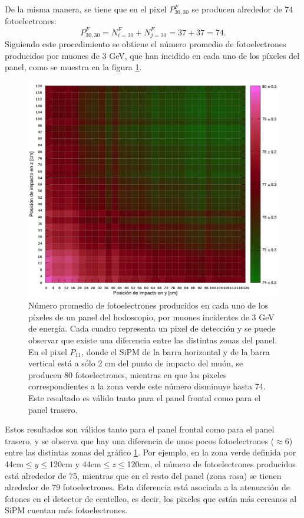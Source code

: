 \documentclass[12pt,oneside,openany,letter]{book}
\begin{document}
De la misma manera, se tiene que en el pixel $P^{F}_{30,30}$ se producen alrededor de 74 fotoelectrones:
\begin{equation}
P^{F}_{30,30}= N^{F}_{i=30}+N^{F}_{j=30}= 37+37 = 74.
\end{equation}
Siguiendo este procedimiento se obtiene el número promedio de fotoelectrones producidos por muones de 3 GeV, que han incidido en cada uno de los píxeles del panel, como se muestra en la figura \ref{atenuacion_panel_round}. 
\begin{figure}[h!]
    \centering
        \includegraphics[scale=0.6]{atenuacion_panel_nuevo_2.png}
   \caption[Respuesta de los paneles del hodoscopio]{N\'umero promedio de fotoelectrones producidos en cada uno de los p\'ixeles de un panel del hodoscopio, por muones incidentes de 3 GeV de energ\'ia. Cada cuadro representa un pixel de detecci\'on y se puede observar que existe una diferencia entre las distintas zonas del panel. En el pixel $P_{11}$, donde el SiPM de la barra horizontal y de la barra vertical está a sólo 2 cm del punto de impacto del muón, se producen 80 fotoelectrones, mientras en que los pixeles correspondientes a la zona verde este n\'umero disminuye hasta 74. Este resultado es v\'alido tanto para el panel frontal como para el panel trasero.}\label{atenuacion_panel_round}
\end{figure}

Estos resultados son v\'alidos tanto para el panel frontal como para el panel trasero, y se observa que hay una diferencia de unos pocos fotoelectrones ($\approx 6$) entre las distintas zonas del gr\'afico \ref{atenuacion_panel_round}. Por ejemplo, en la zona verde definida por 44cm$\leq y \leq$120cm y 44cm$\leq z \leq$120cm, el n\'umero de fotoelectrones producidos est\'a alrededor de 75, mientras que en el resto del panel (zona rosa) se tienen alrededor de 79 fotoelectrones. Esta diferencia est\'a asociada a la atenuaci\'on de fotones en el detector de centelleo, es decir, los pixeles que est\'an m\'as cercanos al SiPM cuentan m\'as fotoelectrones. 
\end{document}
